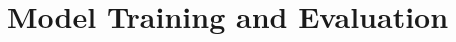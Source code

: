 \documentclass{article}
\begin{document}
\section{Model Training and Evaluation}

%
%
%
    
    
\end{document}
